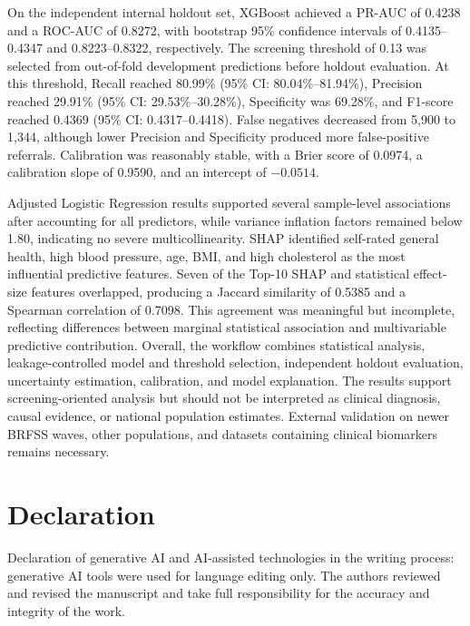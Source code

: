 \documentclass[pdflatex,sn-basic,Numbered]{sn-jnl}
\begin{document}
On the independent internal holdout set, XGBoost achieved a PR-AUC of 0.4238 and a ROC-AUC of 0.8272, with bootstrap 95\% confidence intervals of 0.4135--0.4347 and 0.8223--0.8322, respectively. The screening threshold of 0.13 was selected from out-of-fold development predictions before holdout evaluation. At this threshold, Recall reached 80.99\% (95\% CI: 80.04\%--81.94\%), Precision reached 29.91\% (95\% CI: 29.53\%--30.28\%), Specificity was 69.28\%, and F1-score reached 0.4369 (95\% CI: 0.4317--0.4418). False negatives decreased from 5,900 to 1,344, although lower Precision and Specificity produced more false-positive referrals. Calibration was reasonably stable, with a Brier score of 0.0974, a calibration slope of 0.9590, and an intercept of $-0.0514$.

Adjusted Logistic Regression results supported several sample-level associations after accounting for all predictors, while variance inflation factors remained below 1.80, indicating no severe multicollinearity. SHAP identified self-rated general health, high blood pressure, age, BMI, and high cholesterol as the most influential predictive features. Seven of the Top-10 SHAP and statistical effect-size features overlapped, producing a Jaccard similarity of 0.5385 and a Spearman correlation of 0.7098. This agreement was meaningful but incomplete, reflecting differences between marginal statistical association and multivariable predictive contribution. Overall, the workflow combines statistical analysis, leakage-controlled model and threshold selection, independent holdout evaluation, uncertainty estimation, calibration, and model explanation. The results support screening-oriented analysis but should not be interpreted as clinical diagnosis, causal evidence, or national population estimates. External validation on newer BRFSS waves, other populations, and datasets containing clinical biomarkers remains necessary.


\section*{Declaration}

Declaration of generative AI and AI-assisted technologies in the writing
process: generative AI tools were used for language editing only. The authors
reviewed and revised the manuscript and take full responsibility for the
accuracy and integrity of the work.

\backmatter


\end{document}
